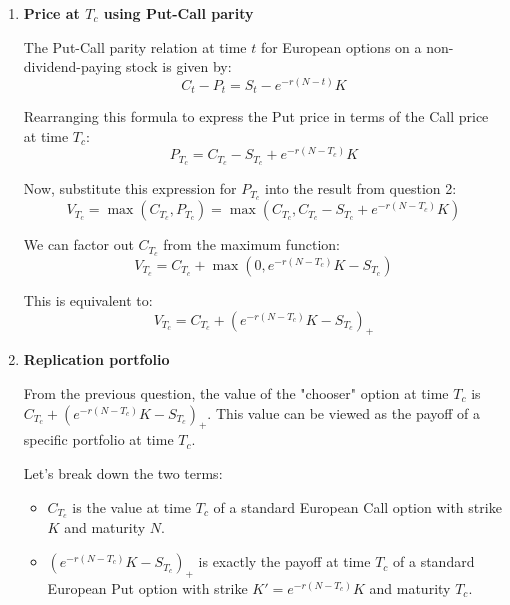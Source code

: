 \begin{enumerate}
            Recognizing the pricing formulas for the Call and Put options at time $T_c$:
            \[ C_{T_c} = \mathbb{E}^*\left[ e^{-r(N-T_c)} (S_N - K)_+ \mid \mathcal{F}_{T_c} \right] \]
            \[ P_{T_c} = \mathbb{E}^*\left[ e^{-r(N-T_c)} (K - S_N)_+ \mid \mathcal{F}_{T_c} \right] \]

            We get:
            \[ V_{T_c} = \mathds{1}_{C_{T_c} \ge P_{T_c}} C_{T_c} + \mathds{1}_{C_{T_c} < P_{T_c}} P_{T_c} \]

            This expression is exactly the definition of the maximum between $C_{T_c}$ and $P_{T_c}$. Thus, $V_{T_c} = \max(C_{T_c}, P_{T_c})$.

      \item \textbf{Price at $T_c$ using Put-Call parity}

            The Put-Call parity relation at time $t$ for European options on a non-dividend-paying stock is given by:
            \[ C_t - P_t = S_t - e^{-r(N-t)} K \]

            Rearranging this formula to express the Put price in terms of the Call price at time $T_c$:
            \[ P_{T_c} = C_{T_c} - S_{T_c} + e^{-r(N-T_c)} K \]

            Now, substitute this expression for $P_{T_c}$ into the result from question 2:
            \[ V_{T_c} = \max(C_{T_c}, P_{T_c}) = \max\left(C_{T_c}, C_{T_c} - S_{T_c} + e^{-r(N-T_c)} K\right) \]

            We can factor out $C_{T_c}$ from the maximum function:
            \[ V_{T_c} = C_{T_c} + \max\left(0, e^{-r(N-T_c)} K - S_{T_c}\right) \]

            This is equivalent to:
            \[ V_{T_c} = C_{T_c} + \left(e^{-r(N-T_c)} K - S_{T_c}\right)_+ \]

      \item \textbf{Replication portfolio}

            From the previous question, the value of the "chooser" option at time $T_c$ is $C_{T_c} + (e^{-r(N-T_c)} K - S_{T_c})_+$. This value can be viewed as the payoff of a specific portfolio at time $T_c$.

            Let's break down the two terms:
            \begin{itemize}
                  \item $C_{T_c}$ is the value at time $T_c$ of a standard European Call option with strike $K$ and maturity $N$.
                  \item $(e^{-r(N-T_c)} K - S_{T_c})_+$ is exactly the payoff at time $T_c$ of a standard European Put option with strike $K' = e^{-r(N-T_c)} K$ and maturity $T_c$.
            \end{itemize}


\end{enumerate}
